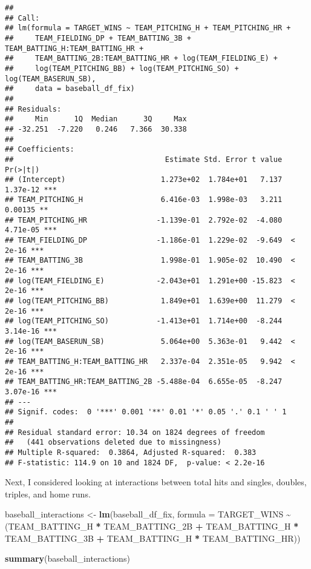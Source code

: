 \documentclass[
]{article}
\newenvironment{Shaded}{\begin{snugshade}}{\end{snugshade}}
\newcommand{\DataTypeTok}[1]{\textcolor[rgb]{0.13,0.29,0.53}{#1}}
\newcommand{\KeywordTok}[1]{\textcolor[rgb]{0.13,0.29,0.53}{\textbf{#1}}}
\newcommand{\NormalTok}[1]{#1}
\newcommand{\OperatorTok}[1]{\textcolor[rgb]{0.81,0.36,0.00}{\textbf{#1}}}
\newcommand{\StringTok}[1]{\textcolor[rgb]{0.31,0.60,0.02}{#1}}
\begin{document}
\begin{verbatim}
## 
## Call:
## lm(formula = TARGET_WINS ~ TEAM_PITCHING_H + TEAM_PITCHING_HR + 
##     TEAM_FIELDING_DP + TEAM_BATTING_3B + TEAM_BATTING_H:TEAM_BATTING_HR + 
##     TEAM_BATTING_2B:TEAM_BATTING_HR + log(TEAM_FIELDING_E) + 
##     log(TEAM_PITCHING_BB) + log(TEAM_PITCHING_SO) + log(TEAM_BASERUN_SB), 
##     data = baseball_df_fix)
## 
## Residuals:
##     Min      1Q  Median      3Q     Max 
## -32.251  -7.220   0.246   7.366  30.338 
## 
## Coefficients:
##                                   Estimate Std. Error t value Pr(>|t|)    
## (Intercept)                      1.273e+02  1.784e+01   7.137 1.37e-12 ***
## TEAM_PITCHING_H                  6.416e-03  1.998e-03   3.211  0.00135 ** 
## TEAM_PITCHING_HR                -1.139e-01  2.792e-02  -4.080 4.71e-05 ***
## TEAM_FIELDING_DP                -1.186e-01  1.229e-02  -9.649  < 2e-16 ***
## TEAM_BATTING_3B                  1.998e-01  1.905e-02  10.490  < 2e-16 ***
## log(TEAM_FIELDING_E)            -2.043e+01  1.291e+00 -15.823  < 2e-16 ***
## log(TEAM_PITCHING_BB)            1.849e+01  1.639e+00  11.279  < 2e-16 ***
## log(TEAM_PITCHING_SO)           -1.413e+01  1.714e+00  -8.244 3.14e-16 ***
## log(TEAM_BASERUN_SB)             5.064e+00  5.363e-01   9.442  < 2e-16 ***
## TEAM_BATTING_H:TEAM_BATTING_HR   2.337e-04  2.351e-05   9.942  < 2e-16 ***
## TEAM_BATTING_HR:TEAM_BATTING_2B -5.488e-04  6.655e-05  -8.247 3.07e-16 ***
## ---
## Signif. codes:  0 '***' 0.001 '**' 0.01 '*' 0.05 '.' 0.1 ' ' 1
## 
## Residual standard error: 10.34 on 1824 degrees of freedom
##   (441 observations deleted due to missingness)
## Multiple R-squared:  0.3864, Adjusted R-squared:  0.383 
## F-statistic: 114.9 on 10 and 1824 DF,  p-value: < 2.2e-16
\end{verbatim}

Next, I considered looking at interactions between total hits and
singles, doubles, triples, and home runs.

\begin{Shaded}
\begin{Highlighting}[]
\NormalTok{baseball\_interactions \textless{}{-}}\StringTok{ }\KeywordTok{lm}\NormalTok{(baseball\_df\_fix, }\DataTypeTok{formula =}\NormalTok{ TARGET\_WINS }\OperatorTok{\textasciitilde{}}\StringTok{ }\NormalTok{(TEAM\_BATTING\_H }\OperatorTok{*}\StringTok{ }\NormalTok{TEAM\_BATTING\_2B }\OperatorTok{+}\StringTok{ }\NormalTok{TEAM\_BATTING\_H }\OperatorTok{*}\StringTok{ }\NormalTok{TEAM\_BATTING\_3B }\OperatorTok{+}\StringTok{ }\NormalTok{TEAM\_BATTING\_H }\OperatorTok{*}\StringTok{ }\NormalTok{TEAM\_BATTING\_HR))}

\KeywordTok{summary}\NormalTok{(baseball\_interactions)}
\end{Highlighting}
\end{Shaded}
\end{document}
